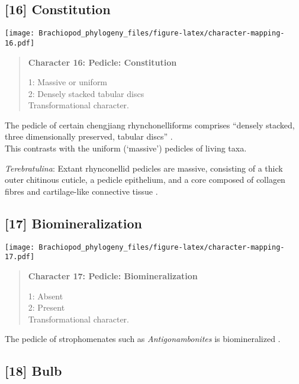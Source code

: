 \documentclass[openany]{book}
\theoremstyle{definition}
\theoremstyle{definition}
\theoremstyle{definition}
\theoremstyle{remark}
\begin{document}
\subsection*{{[}16{]} Constitution}\label{constitution}

\texttt{[image: Brachiopod\_phylogeny\_files/figure-latex/character-mapping-16.pdf]}

\begin{quote}
\textbf{Character 16: Pedicle: Constitution}

1: Massive or uniform\\
2: Densely stacked tabular discs\\
Transformational character.
\end{quote}

The pedicle of certain chengjiang rhynchonelliforms comprises ``densely
stacked, three dimensionally preserved, tabular discs''
\citep{Holmer2018Evolutionarysignificance}.\\
This contrasts with the uniform (`massive') pedicles of living taxa.

\hypertarget{Terebratulina-coding-16}{}
\emph{Terebratulina}: Extant rhynconellid pedicles are massive,
consisting of a thick outer chitinous cuticle, a pedicle epithelium, and
a core composed of collagen fibres and cartilage-like connective tissue
\citep{Holmer2018Evolutionarysignificance}.

\subsection*{{[}17{]} Biomineralization}\label{biomineralization}

\texttt{[image: Brachiopod\_phylogeny\_files/figure-latex/character-mapping-17.pdf]}

\begin{quote}
\textbf{Character 17: Pedicle: Biomineralization}

1: Absent\\
2: Present\\
Transformational character.
\end{quote}

The pedicle of strophomenates such as \emph{Antigonambonites} is
biomineralized \citep{Holmer2018Evolutionarysignificance}.

\subsection*{{[}18{]} Bulb}\label{bulb}
\end{document}
